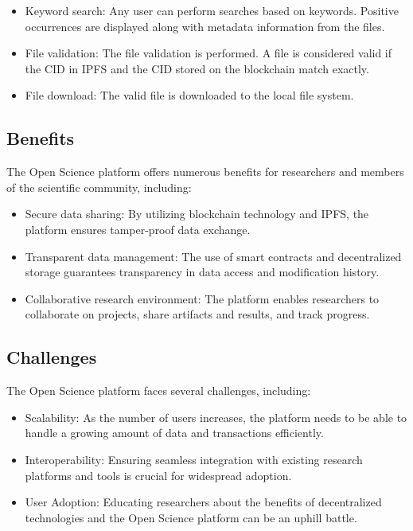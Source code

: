 \documentclass{article}
\begin{document}
\begin{itemize}
    \item Keyword search:
          \indent Any user can perform searches based on keywords. Positive occurrences are displayed along with metadata information from the files.

    \item File validation:
          \indent The file validation is performed. A file is considered valid if the CID in IPFS and the CID stored on the blockchain match exactly.

    \item File download:
          \indent The valid file is downloaded to the local file system.
\end{itemize}




\subsection{Benefits}

The Open Science platform offers numerous benefits for researchers and members of the scientific community, including:

\begin{itemize}
    \item Secure data sharing: By utilizing blockchain technology and IPFS, the platform ensures tamper-proof data exchange.
    \item Transparent data management: The use of smart contracts and decentralized storage guarantees transparency in data access and modification history.
    \item Collaborative research environment: The platform enables researchers to collaborate on projects, share artifacts and results, and track progress.
\end{itemize}

\subsection{Challenges}

The Open Science platform faces several challenges, including:

\begin{itemize}
    \item Scalability: As the number of users increases, the platform needs to be able to handle a growing amount of data and transactions efficiently.
    \item Interoperability: Ensuring seamless integration with existing research platforms and tools is crucial for widespread adoption.
    \item User Adoption: Educating researchers about the benefits of decentralized technologies and the Open Science platform can be an uphill battle.
\end{itemize}
\end{document}
